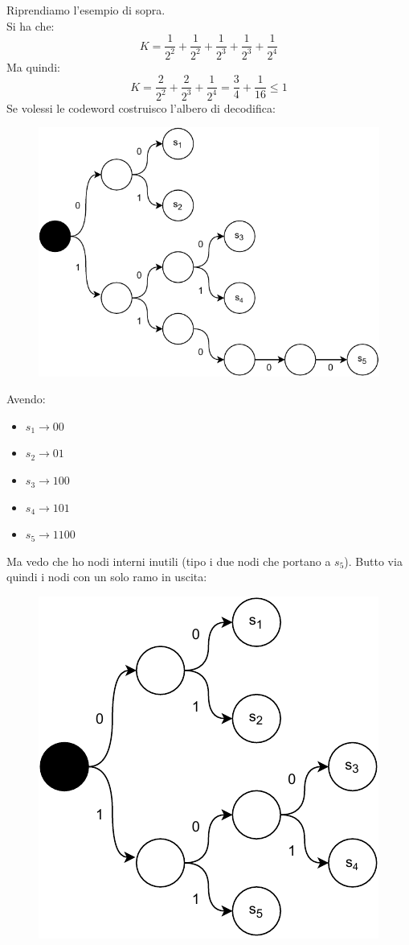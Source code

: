 \documentclass[a4paper,12pt, oneside]{book}
\begin{document}
\begin{esempio}
  Riprendiamo l'esempio di sopra.\\
  Si ha che: 
  \[K=\frac{1}{2^2}+\frac{1}{2^2}+\frac{1}{2^3}+\frac{1}{2^3}+\frac{1}{2^4}\]
  Ma quindi:
  \[K=\frac{2}{2^2}+\frac{2}{2^3}+\frac{1}{2^4}=\frac{3}{4}+\frac{1}{16}\leq 1\]
  \newpage
  Se volessi le codeword costruisco l'albero di decodifica:
  \begin{figure}[H]
    \centering
    \includegraphics[scale = 0.7]{img/ct8.pdf}
  \end{figure}
  Avendo:
   \begin{itemize}
    \item $s_1\to 00$
    \item $s_2\to 01$
    \item $s_3\to 100$
    \item $s_4\to 101$
    \item $s_5\to 1100$
  \end{itemize}
  Ma vedo che ho nodi interni inutili (tipo i due nodi che portano a $s_5$).
  Butto via quindi i nodi con un solo ramo in uscita:
  \begin{figure}[H]
    \centering
    \includegraphics[scale = 0.7]{img/ct9.pdf}

\end{figure}
\end{esempio}
\end{document}
